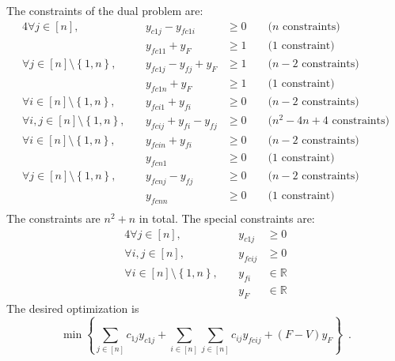 The constraints of the dual problem are:
\begin{alignat*}{4}
  \forall j \in \left[n\right], && y_{c1j} - y_{fc1i} &\geq 0 &&\mbox{ ($n$ constraints)} \\
  && y_{fc11} + y_F &\geq 1 &&\mbox{ (1 constraint)} \\
  \forall j \in \left[n\right] \setminus \left\{1, n\right\}, &\:& y_{fc1j} - y_{fj} + y_F &\geq 1 &&
    \mbox{ ($n - 2$ constraints)} \\
  && y_{fc1n} + y_F &\geq 1 &&\mbox{ (1 constraint)} \\       
  \forall i \in \left[n\right] \setminus \left\{1, n\right\}, && y_{fci1} + y_{fi} &\geq 0 &&
    \mbox{ ($n - 2$ constraints)} \\
  \forall i, j \in \left[n\right] \setminus \left\{1, n\right\}, &\:& y_{fcij} + y_{fi} - y_{fj} &\geq 0 &&
    \mbox{ ($n^2 - 4n + 4$ constraints)} \\
  \forall i \in \left[n\right] \setminus \left\{1, n\right\}, && y_{fcin} + y_{fi} &\geq 0 &&
    \mbox{ ($n - 2$ constraints)} \\
  && y_{fcn1} &\geq 0 &&\mbox{ (1 constraint)} \\
  \forall j \in \left[n\right] \setminus \left\{1, n\right\}, && y_{fcnj} - y_{fj} &\geq 0 &&
    \mbox{ ($n - 2$ constraints)} \\
  && y_{fcnn} &\geq 0 &&\mbox{ (1 constraint)} \\
\end{alignat*}
The constraints are $n^2 + n$ in total. The special constraints are:
\begin{alignat*}{4}
  \forall j \in \left[n\right], && y_{c1j} &\geq 0 \\
  \forall i, j \in \left[n\right], &\:& y_{fcij} &\geq 0 \\
  \forall i \in \left[n\right] \setminus \left\{1, n\right\}, && y_{fi} &\in \mathbb{R} \\
  && y_F &\in \mathbb{R}
\end{alignat*}
The desired optimization is
\begin{equation*}
  \min{\left\{\sum\limits_{j \in \left[n\right]}c_{1j}y_{c1j} + \sum\limits_{i \in \left[n\right]}\sum\limits_{j \in
       \left[n\right]}c_{ij}y_{fcij} + \left(F - V\right)y_F\right\}} \enspace.
\end{equation*}
